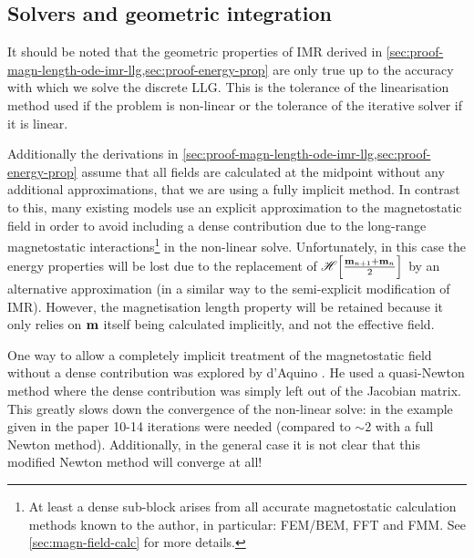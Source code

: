 \subsection{Solvers and geometric integration}

It should be noted that the geometric properties of IMR derived in \cref{sec:proof-magn-length-ode-imr-llg,sec:proof-energy-prop} are only true up to the accuracy with which we solve the discrete LLG.
This is the tolerance of the linearisation method used if the problem is non-linear or the tolerance of the iterative solver if it is linear.

Additionally the derivations in \cref{sec:proof-magn-length-ode-imr-llg,sec:proof-energy-prop} assume that all fields are calculated at the midpoint without any additional approximations, \ie that we are using a fully implicit method.
In contrast to this, many existing models use an explicit approximation to the magnetostatic field in order to avoid including a dense contribution due to the long-range magnetostatic interactions\footnote{At least a dense sub-block arises from all accurate magnetostatic calculation methods known to the author, in particular: FEM/BEM, FFT and FMM. See \cref{sec:magn-field-calc} for more details.} in the non-linear solve.
Unfortunately, in this case the energy properties will be lost due to the replacement of $\mathscr{H} {\left[ \frac{\boldsymbol{\mathrm{m}}_{n+1} + \boldsymbol{\mathrm{m}}_n}{2} \right]}$ by an alternative approximation (in a similar way to the semi-explicit modification of IMR).
However, the magnetisation length property will be retained because it only relies on $\boldsymbol{\mathrm{m}}$ itself being calculated implicitly, and not the effective field.


One way to allow a completely implicit treatment of the magnetostatic field without a dense contribution was explored by d'Aquino \cite{DAquino2005}.
He used a quasi-Newton method where the dense contribution was simply left out of the Jacobian matrix.
This greatly slows down the convergence of the non-linear solve: in the example given in the paper 10-14 iterations were needed (compared to $\sim2$ with a full Newton method).
Additionally, in the general case it is not clear that this modified Newton method will converge at all!

